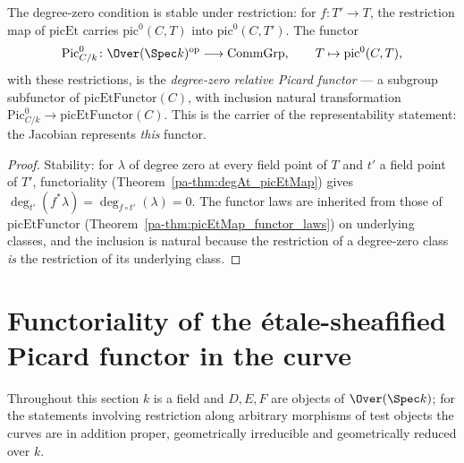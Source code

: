 \begin{definition}
  \label{pa-def:pic0Functor}
  \leanok

  The degree-zero condition is stable under restriction: for \(f \colon T' \to T\), the
  restriction map of \(\mathrm{picEt}\) carries \(\mathrm{pic}^0(C,T)\) into
  \(\mathrm{pic}^0(C,T')\). The functor
  \[
    \mathrm{Pic}^0_{C/k} \colon \Over(\Spec k)^{\mathrm{op}} \longrightarrow \mathrm{CommGrp},
    \qquad T \mapsto \mathrm{pic}^0(C,T),
  \]
  with these restrictions, is the \emph{degree-zero relative Picard functor} — a subgroup
  subfunctor of \(\mathrm{picEtFunctor}(C)\), with inclusion natural transformation
  \(\mathrm{Pic}^0_{C/k} \to \mathrm{picEtFunctor}(C)\). This is the carrier of the
  representability statement: the Jacobian represents \emph{this} functor.
\end{definition}
\begin{proof}
  \leanok
  Stability: for \(\lambda\) of degree zero at every field point of \(T\) and \(t'\) a field
  point of \(T'\), functoriality (Theorem~\ref{pa-thm:degAt_picEtMap}) gives
  \(\deg_{t'}(f^{*}\lambda) = \deg_{f \circ t'}(\lambda) = 0\). The functor laws are
  inherited from those of \(\mathrm{picEtFunctor}\)
  (Theorem~\ref{pa-thm:picEtMap_functor_laws}) on underlying classes, and the inclusion is
  natural because the restriction of a degree-zero class \emph{is} the restriction of its
  underlying class.
\end{proof}

\section{Functoriality of the \'etale-sheafified Picard functor in the curve}

Throughout this section \(k\) is a field and \(D, E, F\) are objects of
\(\Over(\Spec k)\); for the statements involving restriction along arbitrary morphisms
of test objects the curves are in addition proper, geometrically irreducible and
geometrically reduced over \(k\).

